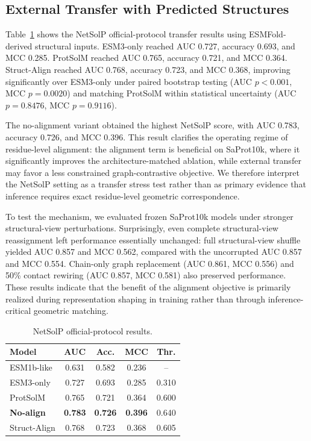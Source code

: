 \documentclass[conference]{IEEEtran}
\begin{document}
\subsection{External Transfer with Predicted Structures}
Table~\ref{tab:netsolp} shows the NetSolP official-protocol transfer results using ESMFold-derived structural inputs. ESM3-only reached AUC 0.727, accuracy 0.693, and MCC 0.285. ProtSolM reached AUC 0.765, accuracy 0.721, and MCC 0.364. Struct-Align reached AUC 0.768, accuracy 0.723, and MCC 0.368, improving significantly over ESM3-only under paired bootstrap testing (AUC $p<0.001$, MCC $p=0.0020$) and matching ProtSolM within statistical uncertainty (AUC $p=0.8476$, MCC $p=0.9116$).

The no-alignment variant obtained the highest NetSolP score, with AUC 0.783, accuracy 0.726, and MCC 0.396. This result clarifies the operating regime of residue-level alignment: the alignment term is beneficial on SaProt10k, where it significantly improves the architecture-matched ablation, while external transfer may favor a less constrained graph-contrastive objective. We therefore interpret the NetSolP setting as a transfer stress test rather than as primary evidence that inference requires exact residue-level geometric correspondence.

To test the mechanism, we evaluated frozen SaProt10k models under stronger structural-view perturbations. Surprisingly, even complete structural-view reassignment left performance essentially unchanged: full structural-view shuffle yielded AUC 0.857 and MCC 0.562, compared with the uncorrupted AUC 0.857 and MCC 0.554. Chain-only graph replacement (AUC 0.861, MCC 0.556) and 50\% contact rewiring (AUC 0.857, MCC 0.581) also preserved performance. These results indicate that the benefit of the alignment objective is primarily realized during representation shaping in training rather than through inference-critical geometric matching.

\begin{table}[t]
\centering
\caption{NetSolP official-protocol results.}
\label{tab:netsolp}
\begin{tabular}{lcccc}
\toprule
Model & AUC & Acc. & MCC & Thr. \\
\midrule
ESM1b-like & 0.631 & 0.582 & 0.236 & -- \\
ESM3-only & 0.727 & 0.693 & 0.285 & 0.310 \\
ProtSolM & 0.765 & 0.721 & 0.364 & 0.600 \\
\rowcolor{gray!12}\textbf{No-align} & \textbf{0.783} & \textbf{0.726} & \textbf{0.396} & 0.640 \\
Struct-Align & 0.768 & 0.723 & 0.368 & 0.605 \\
\bottomrule
\end{tabular}
\end{table}
\end{document}
